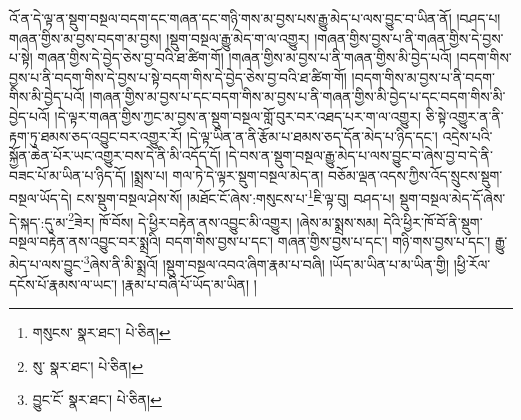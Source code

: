 འོ་ན་དེ་ལྟ་ན་སྡུག་བསྔལ་བདག་དང་གཞན་དང་གཉི་གས་མ་བྱས་པས་རྒྱུ་མེད་པ་ལས་བྱུང་བ་ཡིན་ནོ། །བཤད་པ། གཞན་གྱིས་མ་བྱས་བདག་མ་བྱས། །སྡུག་བསྔལ་རྒྱུ་མེད་ག་ལ་འགྱུར། །གཞན་གྱིས་བྱས་པ་ནི་གཞན་གྱིས་དེ་བྱས་པ་སྟེ། གཞན་གྱིས་དེ་བྱེད་ཅེས་བྱ་བའི་ཐ་ཚིག་གོ། །གཞན་གྱིས་མ་བྱས་པ་ནི་གཞན་གྱིས་མི་བྱེད་པའོ། །བདག་གིས་བྱས་པ་ནི་བདག་གིས་དེ་བྱས་པ་སྟེ་བདག་གིས་དེ་བྱེད་ཅེས་བྱ་བའི་ཐ་ཚིག་གོ། །བདག་གིས་མ་བྱས་པ་ནི་བདག་གིས་མི་བྱེད་པའོ། །གཞན་གྱིས་མ་བྱས་པ་དང་བདག་གིས་མ་བྱས་པ་ནི་གཞན་གྱིས་མི་བྱེད་པ་དང་བདག་གིས་མི་བྱེད་པའོ། །དེ་ལྟར་གཞན་གྱིས་ཀྱང་མ་བྱས་ན་སྡུག་བསྔལ་གློ་བུར་བར་འཐད་པར་ག་ལ་འགྱུར། ཅི་སྟེ་འགྱུར་ན་ནི་རྟག་ཏུ་ཐམས་ཅད་འབྱུང་བར་འགྱུར་རོ། །དེ་ལྟ་ཡིན་ན་ནི་རྩོམ་པ་ཐམས་ཅད་དོན་མེད་པ་ཉིད་དང་། འདྲེས་པའི་སྐྱོན་ཆེན་པོར་ཡང་འགྱུར་བས་དེ་ནི་མི་འདོད་དོ། །དེ་བས་ན་སྡུག་བསྔལ་རྒྱུ་མེད་པ་ལས་བྱུང་བ་ཞེས་བྱ་བ་དེ་ནི་བཟང་པོ་མ་ཡིན་པ་ཉིད་དོ། །སྨྲས་པ། གལ་ཏེ་དེ་ལྟར་སྡུག་བསྔལ་མེད་ན། བཅོམ་ལྡན་འདས་ཀྱིས་འོད་སྲུངས་སྡུག་བསྔལ་ཡོད་དེ། ངས་སྡུག་བསྔལ་ཤེས་སོ། །མཐོང་ངོ་ཞེས་:གསུངས་པ་\footnote{གསུངས་  སྣར་ཐང་།  པེ་ཅིན། }ཇི་ལྟ་བུ། བཤད་པ། སྡུག་བསྔལ་མེད་དོ་ཞེས་དེ་སྐད་:དུ་མ་\footnote{སུ་  སྣར་ཐང་།  པེ་ཅིན། }ཟེར། ཁོ་བོས། དེ་ཕྱིར་བརྟེན་ནས་འབྱུང་མི་འགྱུར། །ཞེས་མ་སྨྲས་སམ། དེའི་ཕྱིར་ཁོ་བོ་ནི་སྡུག་བསྔལ་བརྟེན་ནས་འབྱུང་བར་སྨྲའི། བདག་གིས་བྱས་པ་དང་། གཞན་གྱིས་བྱས་པ་དང་། གཉི་གས་བྱས་པ་དང་། རྒྱུ་མེད་པ་ལས་བྱུང་\footnote{བྱུང་ངོ་  སྣར་ཐང་།  པེ་ཅིན། }ཞེས་ནི་མི་སྨྲའོ། །སྡུག་བསྔལ་འབའ་ཞིག་རྣམ་པ་བཞི། །ཡོད་མ་ཡིན་པ་མ་ཡིན་གྱི། །ཕྱི་རོལ་དངོས་པོ་རྣམས་ལ་ཡང་། །རྣམ་པ་བཞི་པོ་ཡོད་མ་ཡིན། །

